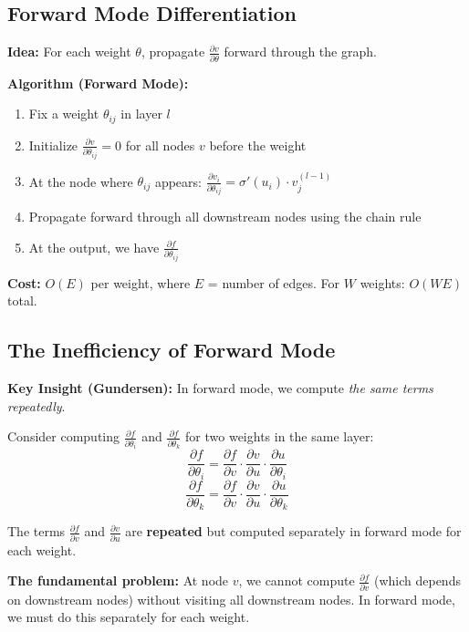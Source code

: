 \documentclass[main.tex]{subfiles}
\begin{document}
\subsection{Forward Mode Differentiation}

\textbf{Idea:} For each weight $\theta$, propagate $\frac{\partial v}{\partial \theta}$ forward through the graph.

\textbf{Algorithm (Forward Mode):}
\begin{enumerate}
    \item Fix a weight $\theta_{ij}$ in layer $l$
    \item Initialize $\frac{\partial v}{\partial \theta_{ij}} = 0$ for all nodes $v$ before the weight
    \item At the node where $\theta_{ij}$ appears: $\frac{\partial v_i}{\partial \theta_{ij}} = \sigma'(u_i) \cdot v_j^{(l-1)}$
    \item Propagate forward through all downstream nodes using the chain rule
    \item At the output, we have $\frac{\partial f}{\partial \theta_{ij}}$
\end{enumerate}

\textbf{Cost:} $O(E)$ per weight, where $E$ = number of edges. For $W$ weights: $O(WE)$ total.

\subsection{The Inefficiency of Forward Mode}

\textbf{Key Insight (Gundersen):} In forward mode, we compute \textit{the same terms repeatedly}.

Consider computing $\frac{\partial f}{\partial \theta_i}$ and $\frac{\partial f}{\partial \theta_k}$ for two weights in the same layer:
$$\frac{\partial f}{\partial \theta_i} = \frac{\partial f}{\partial v} \cdot \frac{\partial v}{\partial u} \cdot \frac{\partial u}{\partial \theta_i}$$
$$\frac{\partial f}{\partial \theta_k} = \frac{\partial f}{\partial v} \cdot \frac{\partial v}{\partial u} \cdot \frac{\partial u}{\partial \theta_k}$$

The terms $\frac{\partial f}{\partial v}$ and $\frac{\partial v}{\partial u}$ are \textbf{repeated} but computed separately in forward mode for each weight.

\textbf{The fundamental problem:} At node $v$, we cannot compute $\frac{\partial f}{\partial v}$ (which depends on downstream nodes) without visiting all downstream nodes. In forward mode, we must do this separately for each weight.
\end{document}
